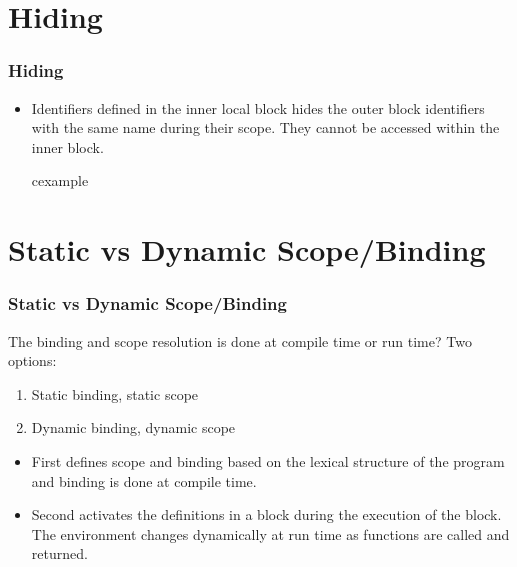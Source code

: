 \section{Hiding}
\begin{frame}
 \frametitle{Hiding}
\begin{itemize}
 \item Identifiers defined in the inner local block hides the outer block identifiers with the
 same name during their scope. They cannot be accessed within the inner block.
\begin{beamercolorbox}{cexample}
\codehidingC
\end{beamercolorbox}
\end{itemize}
\end{frame}

\section{Static vs Dynamic Scope/Binding}
\begin{frame}
 \frametitle{Static vs Dynamic Scope/Binding}
The binding and scope resolution is done at compile time or run time? Two options:
\begin{enumerate}
 \item Static binding, static scope
 \item Dynamic binding, dynamic scope
\end{enumerate}
\begin{itemize}
 \item First defines scope and binding based on the lexical structure of the program and
 binding is done at compile time.
 \item Second activates the definitions in a block during the execution of the block. The
 environment changes dynamically at run time as functions are called and returned.
\end{itemize}
\end{frame}

